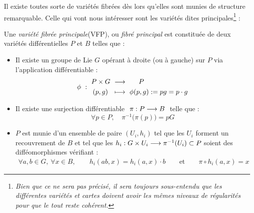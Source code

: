 Il existe toutes sorte de variétés fibrées dès lors qu'elles sont munies de structure remarquable. Celle qui vont nous intéresser sont les variétés dites principales\footnote{\itshape
	Bien que ce ne sera pas précisé, il sera toujours sous-entendu que les différentes variétés et cartes doivent avoir les mêmes niveaux de régularités pour que le tout reste cohérent.} :
\\
\begin{definition} \label{def:VFP}
	Une \emph{variété fibrée principale}(VFP), ou \emph{fibré principal} est constituée de deux variétés différentielles $P$ et $B$ telles que :
	\begin{itemize}
		\item Il existe un groupe de Lie $G$ opérant à droite (ou à gauche) sur $P$ via l'application différentiable :
		\begin{equation} \label{eq:VFP_action}
			\phi\ :\ \begin{aligned}P\times G\ &\longrightarrow\quad\ \ P \\ (p,g)\ \ &\longmapsto\ \phi(p,g):= pg = p\cdot g
			\end{aligned}
		\end{equation}
		
		\item Il existe une surjection différentiable $\ \pi:P\longrightarrow B\ $ telle que :
		\begin{equation} \label{eq:VFP_fibres}
			\forall p\in P,\quad \pi^{-1}\big(\pi(p)\big)=pG
		\end{equation}
		
		\item $P$ est munie d'un ensemble de paire $(U_i, h_i)$ tel que les $U_i$ forment un recouvrement de $B$ et tel que les $h_i : G\times U_i\longrightarrow \pi^{-1}(U_i)\subset P$ soient des difféomorphismes vérifiant :
		\begin{align*} \label{eq:VFP_atlas}
			\forall a,b\in G,\ \forall x\in B,\qquad h_i(ab,x) = h_i(a,x) \cdot b\qquad \text{et} \qquad \pi\circ h_i(a,x) = x
		\end{align*}
	\end{itemize}
	

\end{definition}
